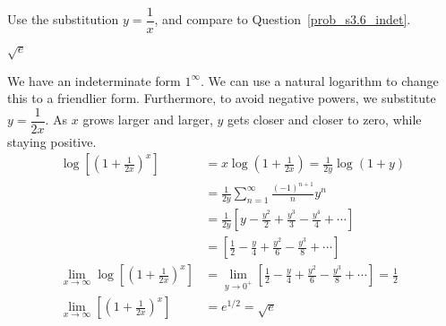 \begin{hint}
Use the substitution $y=\dfrac{1}{x}$, and compare to Question~\ref{prob_s3.6_indet}.
\end{hint}

\begin{answer}
$\sqrt{e}$
\end{answer}

\begin{solution}
We have an indeterminate form $1^\infty$. We can use a natural logarithm to change this to a friendlier form. Furthermore, to avoid negative powers, we substitute $y=\dfrac{1}{2x}$. As $x$ grows larger and larger, $y$ gets closer and closer to zero, while staying positive.
\begin{align*}
\log\left[\left(1+\frac1{2x}\right)^{x}\right]&=x\log\left(1+\frac1{2x}\right)=\frac{1}{2y}\log(1+y)\\
&=\frac{1}{2y}\sum_{n=1}^\infty \frac{(-1)^{n+1}}{n}y^{n}\\
&=\frac{1}{2y}\left[y-\frac{y^2}{2}+\frac{y^3}{3}-\frac{y^4}{4}+\cdots\right]\\
&=\left[\frac{1}{2}-\frac{y}{4}+\frac{y^2}{6}-\frac{y^3}{8}+\cdots\right]\\
\lim_{x \to \infty}\log\left[\left(1+\frac1{2x}\right)^{x}\right]&=\lim_{y \to 0^+}\left[\frac{1}{2}-\frac{y}{4}+\frac{y^2}{6}-\frac{y^3}{8}+\cdots\right]=\frac{1}{2}\\
\lim_{x \to \infty}\left[\left(1+\frac1{2x}\right)^{x}\right]&=e^{1/2}=\sqrt{e}
\end{align*}
\end{solution}


